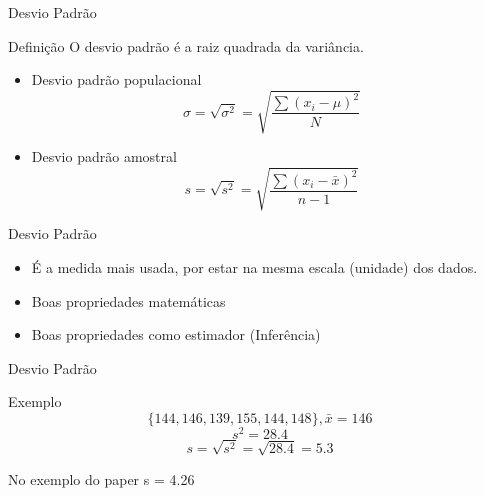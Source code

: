 \documentclass{beamer}
\begin{document}
\begin{frame}{\scriptsize Desvio Padrão}
  \begin{block}{Definição}
    O desvio padrão é a raiz quadrada da variância.
  \end{block}
  \begin{itemize}
    \footnotesize
  \item Desvio padrão populacional
    $$ \sigma = \sqrt{ \sigma^2 } = \sqrt{ \frac{\sum (x_i - \mu)^2}{N} } $$
  \item Desvio padrão amostral
    $$ s = \sqrt{s^2 } = \sqrt{ \frac{\sum (x_i - \bar{x})^2}{n-1} } $$
  \end{itemize}
\end{frame}

\begin{frame}{\scriptsize Desvio Padrão}
  \begin{itemize}
    \footnotesize
  \item É a medida mais usada, por estar na mesma escala (unidade) dos
    dados.
  \item Boas propriedades matemáticas
  \item Boas propriedades como estimador (Inferência)
  \end{itemize}
\end{frame}

\begin{frame}{\scriptsize Desvio Padrão}
  \begin{exampleblock}{Exemplo}
    \scriptsize
      \begin{displaymath}
        \{144, 146, 139, 155, 144, 148\}, \bar{x} = 146
      \end{displaymath}
      \medskip
      \begin{displaymath}
        s^2 = 28.4
      \end{displaymath}
      \medskip
      \begin{displaymath}
        s = \sqrt{s^2} = \sqrt{28.4} = 5.3
    \end{displaymath}
  \end{exampleblock}
  \begin{block}{No exemplo do paper}
    \footnotesize
    s = 4.26
  \end{block}
\end{frame}
\end{document}
